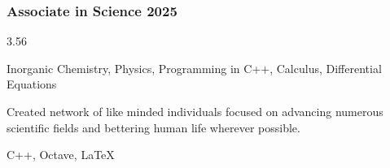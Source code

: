 \documentclass[10pt]{article} %
\begin{document}
\subsubsection{Associate in Science \hfill 2025}
\begin{description}[style=multiline, leftmargin=2.75cm]
    \item[GPA] {3.56}
    \item[Coursework] {Inorganic Chemistry, Physics, Programming in C++, Calculus, 
        Differential Equations}
    \item[Social] {Created network of like minded individuals focused on 
        advancing numerous scientific fields and bettering human life wherever 
        possible.}  
    \item[Technologies] {C++, Octave, LaTeX}
\end{description}
\end{document}
